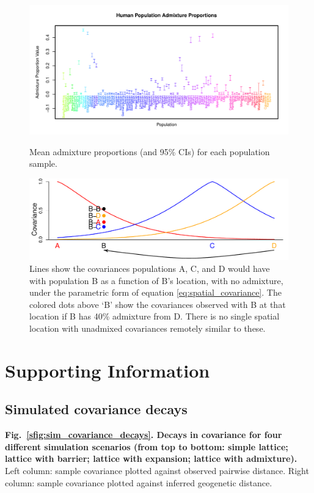 \documentclass[10pt,letterpaper]{article}
\begin{document}
\begin{figure}
			{\includegraphics[width=\textwidth,height=0.45\textwidth]{../figs/globetrotter/globe_adprop.pdf}}
	\caption{Mean admixture proportions (and 95\% CIs) for each population sample.
	\label{globe_ad_props}
    }
\end{figure}

\begin{figure}[htp!]
	\centering
	\includegraphics[width=\textwidth]{../figs/sims/Admix_covar_toy_fig.pdf}
	\caption{
    Lines show the covariances populations A, C, and D would have with population B as a function of B's location,
    with no admixture,
    under the parametric form of equation \eqref{eq:spatial_covariance}.
    The colored dots above `B' show the covariances observed with B at that location if B has 40\% admixture from D.
    There is no single spatial location with unadmixed covariances remotely similar to these.
    } \label{sfig:toy_admixture}
\end{figure}

\clearpage
\newpage

\section*{Supporting Information}


\subsection*{Simulated covariance decays}
\label{sim_covariance_decays}
{\bf{Fig.\ \ref{sfig:sim_covariance_decays}. Decays in covariance for four different simulation scenarios (from top to bottom: simple lattice; lattice with barrier; lattice with expansion; lattice with admixture).} } Left column: sample covariance plotted against observed pairwise distance.  Right column: sample covariance plotted against inferred geogenetic distance.
\end{document}
